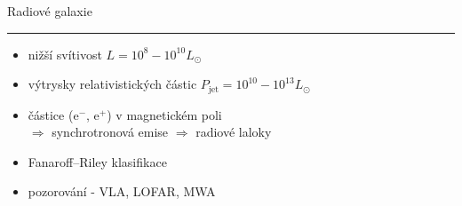 \documentclass[aspectratio=43]{beamer}
\newcommand{\myarrow}[1][0.1pt]{\tikz[baseline=-0.26em,y=3em, x=3em]{\filldraw[line width=#1] (0.4202,0.0021) .. controls (0.4202,-0.0000) and (0.4188,-0.0018) .. (0.4171,-0.0025) .. controls (0.3917,-0.0092) and (0.3699,-0.0236) .. (0.3509,-0.0401) .. controls (0.3355,-0.0538) and (0.3225,-0.0704) .. (0.3130,-0.0890) .. controls (0.3119,-0.0915) and (0.3094,-0.0929) .. (0.3066,-0.0929) .. controls (0.3028,-0.0929) and (0.2996,-0.0897) .. (0.2996,-0.0858) .. controls (0.2996,-0.0848) and (0.3000,-0.0837) .. (0.3003,-0.0827) .. controls (0.3087,-0.0665) and (0.3193,-0.0517) .. (0.3316,-0.0391) -- (0.1181,-0.0391) .. controls (0.1143,-0.0391) and (0.1111,-0.0359) .. (0.1111,-0.0320) .. controls (0.1111,-0.0282) and (0.1143,-0.0250) .. (0.1181,-0.0250) -- (0.3471,-0.0250) .. controls (0.3611,-0.0137) and (0.3766,-0.0046) .. (0.3935,0.0021) .. controls (0.3766,0.0088) and (0.3611,0.0179) .. (0.3471,0.0292) -- (0.1181,0.0292) .. controls (0.1143,0.0292) and (0.1111,0.0323) .. (0.1111,0.0362) .. controls (0.1111,0.0401) and (0.1143,0.0432) .. (0.1181,0.0432) -- (0.3316,0.0432) .. controls (0.3193,0.0559) and (0.3087,0.0707) .. (0.3003,0.0868) .. controls (0.3000,0.0879) and (0.2996,0.0889) .. (0.2996,0.0900) .. controls (0.2996,0.0939) and (0.3028,0.0970) .. (0.3066,0.0970) .. controls (0.3094,0.0970) and (0.3119,0.0956) .. (0.3130,0.0932) .. controls (0.3225,0.0745) and (0.3355,0.0580) .. (0.3509,0.0443) .. controls (0.3699,0.0278) and (0.3917,0.0133) .. (0.4171,0.0067) .. controls (0.4188,0.0059) and (0.4202,0.0042) .. (0.4202,0.0021) -- cycle;}}
\begin{document}
\begin{frame}{\vspace{-2mm}Radiové galaxie\phantom{j$^1$}\\\vspace{1.5mm}\hrule}
\vspace{-11.5mm}
\begin{itemize}
    \item<1-4> nižší svítivost $L = 10^{8} - 10^{10} L_{\odot}$\\ \vspace{2.5mm}
    \item<1-4> výtrysky relativistických částic $P_{\text{jet}} = 10^{10} - 10^{13} L_{\odot}$\\ \vspace{2.5mm}
    \item<1-4> částice (e$^-$, e$^+$) v magnetickém poli\\ \vspace{1.8mm}
        $\Rightarrow$ synchrotronová emise $\Rightarrow$ radiové laloky\\ \vspace{2.5mm}
    \item<3-4> Fanaroff–Riley klasifikace\\ \vspace{2.5mm}
    \item<4> pozorování - VLA, LOFAR, MWA\\
\end{itemize}
\end{frame}
\end{document}
